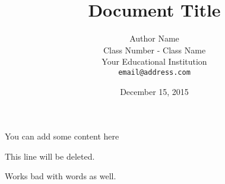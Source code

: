 \documentclass[12pt,fleqn,leqno,letterpaper]{article}
\title{Document Title}
\author{Author Name\\
  \small{Class Number - Class Name}\\
  \small{Your Educational Institution}\\
  \small{\texttt{email@address.com}}
}
\date{December 15, 2015}
\begin{document}
\maketitle



You can add some content here

This line will be deleted.

Works bad with words as well.



\end{document}
